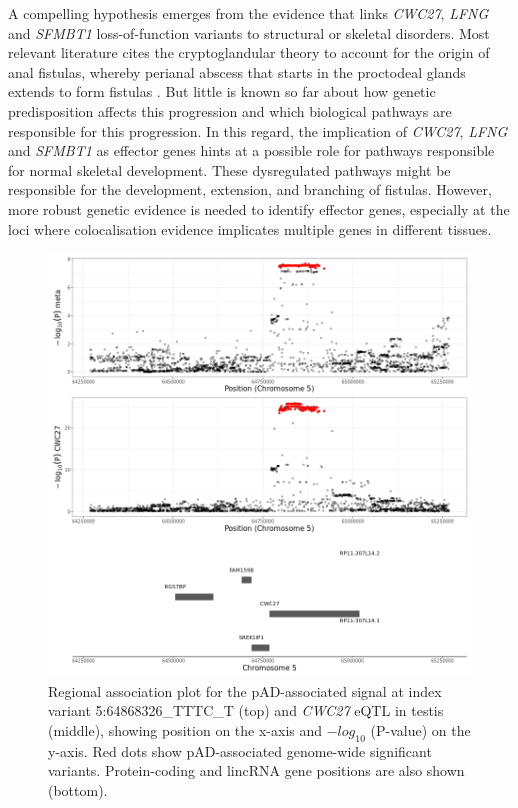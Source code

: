   A compelling hypothesis emerges from the evidence that links \textit{CWC27}, \textit{LFNG} and \textit{SFMBT1} loss-of-function variants to structural or skeletal disorders. Most relevant literature cites the cryptoglandular theory to account for the origin of anal fistulas, whereby perianal abscess that starts in the proctodeal glands extends to form fistulas \cite{Wlodarczyk2021-xw}. But little is known so far about how genetic predisposition affects this progression and which biological pathways are responsible for this progression. In this regard, the implication of \textit{CWC27}, \textit{LFNG} and \textit{SFMBT1} as effector genes hints at a possible role for pathways responsible for normal skeletal development. These dysregulated pathways might be responsible for the development, extension, and branching of fistulas. However, more robust genetic evidence is needed to identify effector genes, especially at the loci where colocalisation evidence implicates multiple genes in different tissues.


  \begin{figure}[H]
    \centering    
    \includegraphics[width=1.0\textwidth]{Vector/cwc27_testis.png}
    \caption[Regional association plots of the pAD-associated locus at index variant 5:64868326\_TTTC\_T and a \textit{CWC27} eQTL in testis]{Regional association plot for the pAD-associated signal at index variant 5:64868326\_TTTC\_T (top) and \textit{CWC27} eQTL in testis (middle), showing position on the x-axis and $-log_{10}$ (P-value) on the y-axis. Red dots show pAD-associated genome-wide significant variants. Protein-coding and lincRNA gene positions are also shown (bottom).}
    \label{fig:cwc27_testis}
    \end{figure}




